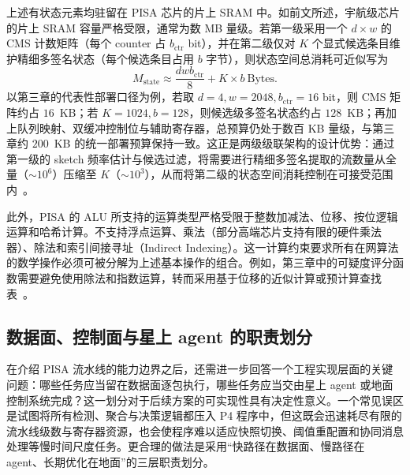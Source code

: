 上述有状态元素均驻留在 PISA 芯片的片上 SRAM 中。如前文所述，宇航级芯片的片上 SRAM 容量严格受限，通常为数 MB 量级。若第一级采用一个 $d\times w$ 的 CMS 计数矩阵（每个 counter 占 $b_{\text{ctr}}$ bit），并在第二级仅对 $K$ 个显式候选条目维护精细多签名状态（每个候选条目占用 $b$ 字节），则状态空间总消耗可近似写为
\begin{equation}
M_{\text{state}} \approx \frac{dwb_{\text{ctr}}}{8} + K \times b\ \text{Bytes}.
\end{equation}
以第三章的代表性部署口径为例，若取 $d=4,w=2048,b_{\text{ctr}}=16$ bit，则 CMS 矩阵约占 $16$~KB；若 $K=1024,b=128$，则候选级多签名状态约占 $128$~KB；再加上队列映射、双缓冲控制位与辅助寄存器，总预算仍处于数百 KB 量级，与第三章约 $200$~KB 的统一部署预算保持一致。这正是两级级联架构的设计优势：通过第一级的 sketch 频率估计与候选过滤，将需要进行精细多签名提取的流数量从全量（$\sim 10^6$）压缩至 $K$（$\sim 10^3$），从而将第二级的状态空间消耗控制在可接受范围内~\cite{satshield}。

此外，PISA 的 ALU 所支持的运算类型严格受限于整数加减法、位移、按位逻辑运算和哈希计算。不支持浮点运算、乘法（部分高端芯片支持有限的硬件乘法器）、除法和索引间接寻址（Indirect Indexing）。这一计算约束要求所有在网算法的数学操作必须可被分解为上述基本操作的组合。例如，第三章中的可疑度评分函数需要避免使用除法和指数运算，转而采用基于位移的近似计算或预计算查找表~\cite{bosshart2013rmt}。


\subsection{数据面、控制面与星上 agent 的职责划分}

在介绍 PISA 流水线的能力边界之后，还需进一步回答一个工程实现层面的关键问题：哪些任务应当留在数据面逐包执行，哪些任务应当交由星上 agent 或地面控制系统完成？这一划分对于后续方案的可实现性具有决定性意义。一个常见误区是试图将所有检测、聚合与决策逻辑都压入 P4 程序中，但这既会迅速耗尽有限的流水线级数与寄存器资源，也会使程序难以适应快照切换、阈值重配置和协同消息处理等慢时间尺度任务。更合理的做法是采用“快路径在数据面、慢路径在 agent、长期优化在地面”的三层职责划分。

